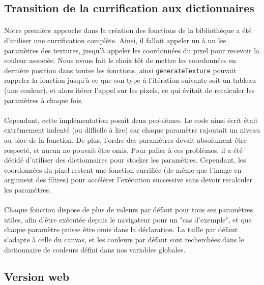 \documentclass[a4paper]{article}
\begin{document}
\subsection{Transition de la currification aux dictionnaires}
\label{sec:curry}

\paragraph{}
Notre première approche dans la création des fonctions de la bibliothèque a été d'utiliser une currification complète. Ainsi, il fallait appeler un à un les paramètres des textures, jusqu'à appeler les coordonnées du pixel pour recevoir la couleur associée. Nous avons fait le choix tôt de mettre les coordonnées en dernière position dans toutes les fonctions, ainsi \texttt{generateTexture} pouvait rappeler la fonction jusqu'à ce que son type à l'itération suivante soit un tableau (une couleur), et alors itérer l'appel sur les pixels, ce qui évitait de recalculer les paramètres à chaque fois.

\paragraph{}
Cependant, cette implémentation posait deux problèmes. Le code ainsi écrit était extrêmement indenté (ou difficile à lire) car chaque paramètre rajoutait un niveau au bloc de la fonction. De plus, l'ordre des paramètres devait absolument être respecté, et aucun ne pouvait être omis. Pour palier à ces problèmes, il a été décidé d'utiliser des dictionnaires pour stocker les paramètres. Cependant, les coordonnées du pixel restent une fonction currifiée (de même que l'image en argument des filtres) pour accélérer l'exécution successive sans devoir recalculer les paramètres.

\paragraph{}
Chaque fonction dispose de plus de valeurs par défaut pour tous ses paramètres utiles, afin d'être exécutée depuis le navigateur pour un "cas d'exemple", et que chaque paramètre puisse être omis dans la déclaration. La taille par défaut s'adapte à celle du canvas, et les couleurs par défaut sont recherchées dans le dictionnaire de couleurs défini dans nos variables globales.



\subsection{Version web}
\label{sec:web}
\end{document}
